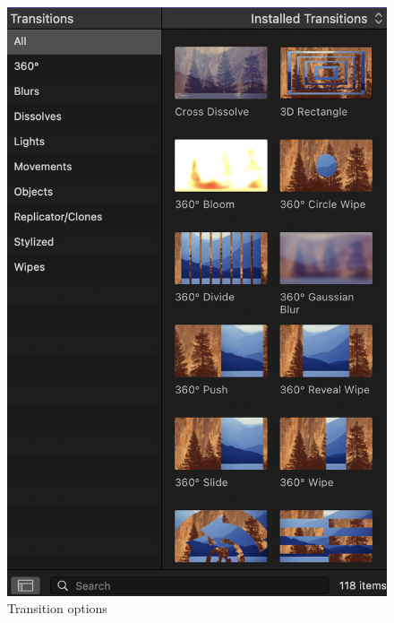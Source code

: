 \documentclass[
]{book}
\begin{document}
\begin{figure}

{\centering \includegraphics[width=1\linewidth]{TOptions} 

}

\caption{Transition options}\label{fig:toptions}
\end{figure}
\end{document}
